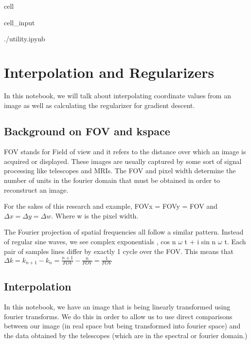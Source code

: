 \documentclass[letterpaper,10pt,english]{jupyterBook}
\begin{document}
\begin{sphinxuseclass}{cell}\begin{sphinxVerbatimInput}

\begin{sphinxuseclass}{cell_input}
\begin{sphinxVerbatim}[commandchars=\\\{\}]
 ./utility.ipynb
\end{sphinxVerbatim}

\end{sphinxuseclass}\end{sphinxVerbatimInput}

\end{sphinxuseclass}

\chapter{Interpolation and Regularizers}
\label{\detokenize{interpolation:interpolation-and-regularizers}}\label{\detokenize{interpolation::doc}}
\sphinxAtStartPar
In this notebook, we will talk about interpolating coordinate values from an image as well as calculating the regularizer
for gradient descent.


\section{Background on FOV and k\sphinxhyphen{}space}
\label{\detokenize{interpolation:background-on-fov-and-k-space}}
\sphinxAtStartPar
FOV stands for Field of view and it refers to the distance over which an image is acquired or displayed. These images are usually captured by some sort of signal processing like telescopes and MRIs. The FOV and pixel width determine the number of units in the fourier domain that must be obtained in order to reconstruct an image.

\sphinxAtStartPar
For the sakes of this research and example, FOVx = FOVy = FOV and \(\Delta x = \Delta y = \Delta w\). Where w is the pixel width.

\sphinxAtStartPar
The Fourier projection of spatial frequencies all follow a similar pattern. Instead of regular sine waves, we see complex exponentials
, cos n \(\omega\) t + i sin n \(\omega\) t. Each pair of samples lines differ by exactly 1 cycle over the FOV. This means that \(\Delta k = k_{n+1} - k_n = \frac{n+1}{FOV}-\frac{n}{FOV} = \frac{1}{FOV}\)


\section{Interpolation}
\label{\detokenize{interpolation:interpolation}}
\sphinxAtStartPar
In this notebook, we have an image that is being linearly transformed using fourier transforms. We do this in order to allow us to use direct comparisons between our image (in real space but being transformed into fourier space) and the data obtained by the telescopes (which are in the spectral or fourier domain.)
\end{document}

